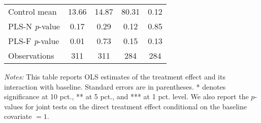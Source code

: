 \begin{table}[ht]
{\begin{threeparttable}
\begin{tabular}{l*{4}{c}}
Control mean    &    13.66         &    14.87         &    80.31         &     0.12         \\
PLS-N \emph{p}-value&     0.17         &     0.29         &     0.12         &     0.85         \\
PLS-F \emph{p}-value&     0.01         &     0.73         &     0.15         &     0.13         \\
Observations    &      311         &      311         &      284         &      284         \\
\bottomrule \end{tabular} \begin{tablenotes}[flushleft] \footnotesize \item \emph{Notes:} This table reports OLS estimates of the treatment effect and its interaction with baseline. Standard errors are in parentheses. * denotes significance at 10 pct., ** at 5 pct., and *** at 1 pct. level. We also report the \(p\)-values for joint tests on the direct treatment effect conditional on the baseline covariate $= 1$. \end{tablenotes} \end{threeparttable} } \end{table}

